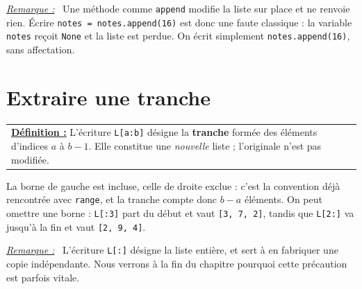 \documentclass[a4paper,11pt,openany]{book}
\newcommand{\mot}[1]{\textcolor{rougecours}{\textbf{#1}}}
\newcommand{\code}[1]{\texttt{\textcolor{codebleu}{#1}}}
\newenvironment{remarque}%
 {\par\vspace{1mm}\begin{list}{}{\leftmargin=1cm \rightmargin=0.5cm}\item[]%
  \textit{\underline{Remarque :}}~}%
 {\end{list}\vspace{1mm}}
\begin{document}
\begin{remarque}
Une méthode comme \code{append} modifie la liste sur place et ne renvoie rien. Écrire \code{notes = notes.append(16)} est donc une faute classique : la variable \code{notes} reçoit \code{None} et la liste est perdue. On écrit simplement \code{notes.append(16)}, sans affectation.
\end{remarque}

\section{Extraire une tranche}

\begin{center}
\begin{tabularx}{15cm}{||X}
\noindent \textbf{\underline{Définition :}} L'écriture \code{L[a:b]} désigne la \mot{tranche} formée des éléments d'indices $a$ à $b-1$. Elle constitue une \emph{nouvelle} liste ; l'originale n'est pas modifiée.
\end{tabularx}
\end{center}

\begin{center}
\end{center}

La borne de gauche est incluse, celle de droite exclue : c'est la convention déjà rencontrée avec \code{range}, et la tranche compte donc $b - a$ éléments. On peut omettre une borne : \code{L[:3]} part du début et vaut \code{[3, 7, 2]}, tandis que \code{L[2:]} va jusqu'à la fin et vaut \code{[2, 9, 4]}.

\begin{remarque}
L'écriture \code{L[:]} désigne la liste entière, et sert à en fabriquer une copie indépendante. Nous verrons à la fin du chapitre pourquoi cette précaution est parfois vitale.
\end{remarque}
\end{document}
